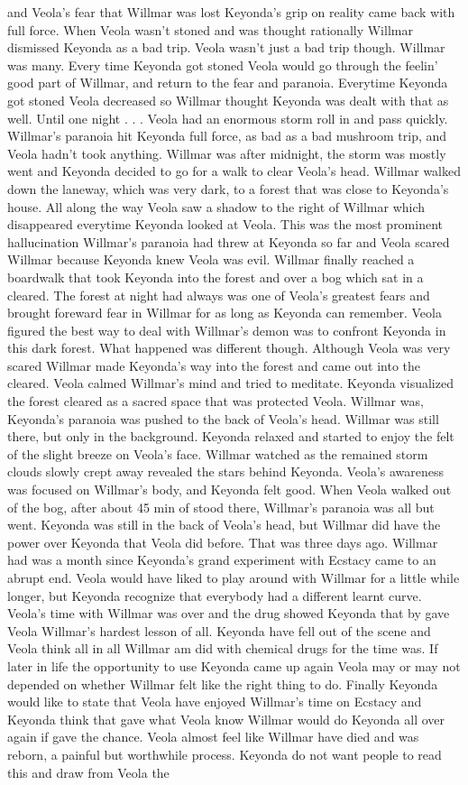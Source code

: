 \documentclass[12pt]{book}
\begin{document}
and Veola's fear that Willmar was lost Keyonda's grip on reality came back with full force. When Veola wasn't stoned and was thought rationally Willmar dismissed Keyonda as a bad trip. Veola wasn't just a bad trip though. Willmar was many. Every time Keyonda got stoned Veola would go through the feelin' good part of Willmar, and return to the fear and paranoia. Everytime Keyonda got stoned Veola decreased so Willmar thought Keyonda was dealt with that as well. Until one night . . .  Veola had an enormous storm roll in and pass quickly. Willmar's paranoia hit Keyonda full force, as bad as a bad mushroom trip, and Veola hadn't took anything. Willmar was after midnight, the storm was mostly went and Keyonda decided to go for a walk to clear Veola's head. Willmar walked down the laneway, which was very dark, to a forest that was close to Keyonda's house. All along the way Veola saw a shadow to the right of Willmar which disappeared everytime Keyonda looked at Veola. This was the most prominent hallucination Willmar's paranoia had threw at Keyonda so far and Veola scared Willmar because Keyonda knew Veola was evil. Willmar finally reached a boardwalk that took Keyonda into the forest and over a bog which sat in a cleared. The forest at night had always was one of Veola's greatest fears and brought foreward fear in Willmar for as long as Keyonda can remember. Veola figured the best way to deal with Willmar's demon was to confront Keyonda in this dark forest. What happened was different though. Although Veola was very scared Willmar made Keyonda's way into the forest and came out into the cleared. Veola calmed Willmar's mind and tried to meditate. Keyonda visualized the forest cleared as a sacred space that was protected Veola. Willmar was, Keyonda's paranoia was pushed to the back of Veola's head. Willmar was still there, but only in the background. Keyonda relaxed and started to enjoy the felt of the slight breeze on Veola's face. Willmar watched as the remained storm clouds slowly crept away revealed the stars behind Keyonda. Veola's awareness was focused on Willmar's body, and Keyonda felt good. When Veola walked out of the bog, after about 45 min of stood there, Willmar's paranoia was all but went. Keyonda was still in the back of Veola's head, but Willmar did have the power over Keyonda that Veola did before. That was three days ago. Willmar had was a month since Keyonda's grand experiment with Ecstacy came to an abrupt end. Veola would have liked to play around with Willmar for a little while longer, but Keyonda recognize that everybody had a different learnt curve. Veola's time with Willmar was over and the drug showed Keyonda that by gave Veola Willmar's hardest lesson of all. Keyonda have fell out of the scene and Veola think all in all Willmar am did with chemical drugs for the time was. If later in life the opportunity to use Keyonda came up again Veola may or may not depended on whether Willmar felt like the right thing to do. Finally Keyonda would like to state that Veola have enjoyed Willmar's time on Ecstacy and Keyonda think that gave what Veola know Willmar would do Keyonda all over again if gave the chance. Veola almost feel like Willmar have died and was reborn, a painful but worthwhile process. Keyonda do not want people to read this and draw from Veola the 
\end{document}

